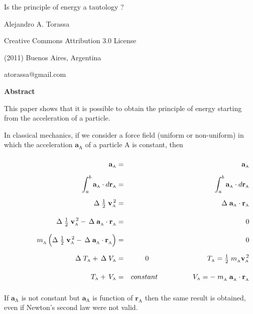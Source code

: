 \documentclass[12pt]{article}
\newcommand{\mM}{m}
\newcommand{\mT}{T}
\newcommand{\mV}{V}
\newcommand{\dos}{^{\,2}}
\newcommand{\ct}{constant}
\newcommand{\vR}{\mathbf{r}}
\newcommand{\vV}{\mathbf{v}}
\newcommand{\vA}{\mathbf{a}}
\newcommand{\ep}{\hspace{+3.6em}}
\newcommand{\eq}{\hspace{+4.5em}}
\newcommand{\ra}{_{\scriptscriptstyle \mathrm A}}
\begin{document}
\begin{center}

{\fontsize{18}{18}\selectfont Is the principle of energy a tautology ?}

\bigskip \bigskip

{\fontsize{12}{12}\selectfont Alejandro A. Torassa}

\bigskip \bigskip

\footnotesize

Creative Commons Attribution 3.0 License

(2011) Buenos Aires, Argentina

atorassa@gmail.com

\bigskip \bigskip

\small

{\bf Abstract}

\bigskip

\parbox{102mm}{This paper shows that it is possible to obtain the principle of energy starting from the acceleration of a particle.}

\end{center}

\normalsize

\bigskip \bigskip

\noindent In classical mechanics, if we consider a force field (uniform or non-uniform) in which the acceleration $\vA\ra$ of a particle A is constant, then

\vspace{-0.3em}

\begin{eqnarray*}
\ep {\vphantom{\int}} \vA\ra & = & \vA\ra \\
\ep \int_a^b \vA\ra \cdot d\vR\ra & = & \int_a^b \vA\ra \cdot d\vR\ra \\
\ep {\vphantom{\int}} \Delta \; {\textstyle \frac{1}{2}} \; \vV\ra\dos & = & \Delta \; \vA\ra \cdot \vR\ra \\
\ep {\vphantom{\int}} \Delta \; {\textstyle \frac{1}{2}} \; \vV\ra\dos - \, \Delta \; \vA\ra^{\vphantom{\dos}} \cdot \vR\ra^{\vphantom{\dos}} & = & 0 \\
\ep {\vphantom{\int}} \mM\ra^{\vphantom{\dos}} \left( \Delta \; {\textstyle \frac{1}{2}} \; \vV\ra\dos - \, \Delta \; \vA\ra^{\vphantom{\dos}} \cdot \vR\ra^{\vphantom{\dos}} \right) & = & 0 \\
\ep {\vphantom{\int}} \Delta \; \mT\ra + \, \Delta \; \mV\ra & = & 0 \eq {\hphantom{\ct}} \mT\ra = {\textstyle \frac{1}{2}} \; \mM\ra^{\vphantom{\dos}}\vV\ra\dos \\
\ep {\vphantom{\int}} \mT\ra + \, \mV\ra & = & \ct \eq {\hphantom{0}} \mV\ra = - \; \mM\ra^{\vphantom{\dos}} \; \vA\ra^{\vphantom{\dos}} \cdot \vR\ra^{\vphantom{\dos}}
\end{eqnarray*}

\vspace{+0.9em}

\noindent If $\vA\ra$ is not constant but $\vA\ra$ is function of $\vR\ra$ then the same result is obtained, even if Newton's second law were not valid.
\end{document}
